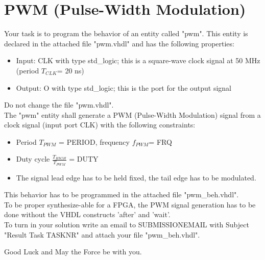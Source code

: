 \documentclass[a4paper,12pt]{article}
\begin{document}
\pagestyle{empty}
\setlength{\parindent}{0em}
\section*{PWM (Pulse-Width Modulation)}
Your task is to program the behavior of an entity called "pwm". This entity is declared in the attached file "pwm.vhdl" and has the following properties:

\begin{itemize}
\item Input:  CLK with type std\_logic; this is a square-wave clock signal at 50 MHz (period $T_{CLK}$= 20 ns)
\item Output: O with type std\_logic; this is the port for the output signal
\end{itemize}
\begin{center}
\end{center}

Do not change the file "pwm.vhdl".\\

The "pwm" entity shall generate a PWM (Pulse-Width Modulation) signal from a clock signal (input port CLK) with the following constraints:
\begin{itemize}
\item Period $T_{PWM}$ = {{PERIOD}}, frequency $f_{PWM}$= {{FRQ}}
\item Duty cycle $\frac{T_{HIGH}}{T_{PWM}}$ = {{DUTY}}
\item The signal lead edge has to be held fixed, the tail edge has to be modulated.
\end{itemize}
\vspace{0.3cm}

This behavior has to be programmed in the attached file "pwm\_beh.vhdl".
\\

To be proper synthesize-able for a FPGA, the PWM signal generation has to be done without the VHDL constructs 'after' and 'wait'.
\\

To turn in your solution write an email to {{SUBMISSIONEMAIL}} with Subject "Result Task {{TASKNR}}" and attach your file "pwm\_beh.vhdl".

\vspace{0.7cm}

Good Luck and May the Force be with you.
\end{document}
